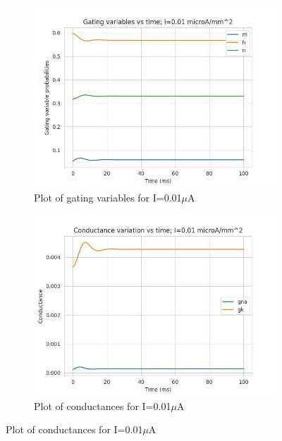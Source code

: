\documentclass{article}
\begin{document}
\begin{figure}[h]
    \begin{subfigure}[b]{0.45\textwidth}
        \includegraphics[width=1.5\textwidth]{2.jpg}
        \caption{Plot of gating variables for I=0.01$\mu$A}
        \label{fig:IO2}
    \end{subfigure}
    \begin{subfigure}[b]{0.45\textwidth}
        \includegraphics[width=1.5\textwidth]{3.jpg}
        \caption{Plot of conductances for I=0.01$\mu$A}
        \label{fig:IO2}
    \end{subfigure}
\end{figure}
\newpage
\end{document}
